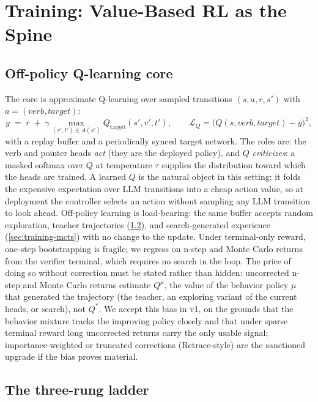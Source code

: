 \section{Training: Value-Based RL as the Spine}
\label{sec:training}

\subsection{Off-policy Q-learning core}
\label{sec:training-core}

The core is approximate Q-learning over sampled transitions
$(s, a, r, s')$ with $a = (\textit{verb}, \textit{target})$:
\[
y \;=\; r \;+\; \gamma \max_{(\textit{v}', \textit{t}') \in A(s')}
Q_{\mathrm{target}}(s', \textit{v}', \textit{t}'),
\qquad
\mathcal{L}_Q = \big(Q(s, \textit{verb}, \textit{target}) - y\big)^2,
\]
with a replay buffer and a periodically synced target network. The roles
are: the verb and pointer heads \emph{act} (they are the deployed policy),
and $Q$ \emph{criticizes}: a masked softmax over $Q$ at temperature $\tau$
supplies the distribution toward which the heads are trained. A learned
$Q$ is the natural object in this setting: it folds the expensive
expectation over LLM transitions into a cheap action value, so at
deployment the controller selects an action without sampling any LLM
transition to look ahead. Off-policy learning is load-bearing: the same
buffer accepts random exploration, teacher trajectories
(\cref{sec:training-ladder}), and search-generated experience
(\cref{sec:training-mcts}) with no change to the update. Under
terminal-only reward, one-step bootstrapping is fragile; we regress on
n-step and Monte Carlo returns from the verifier terminal, which requires
no search in the loop. The price of doing so without correction must be
stated rather than hidden: uncorrected n-step and Monte Carlo returns
estimate $Q^{\mu}$, the value of the behavior policy $\mu$ that generated
the trajectory (the teacher, an exploring variant of the current heads, or
search), not $Q^{*}$. We accept this bias in v1, on the grounds that the
behavior mixture tracks the improving policy closely and that under sparse
terminal reward long uncorrected returns carry the only usable signal;
importance-weighted or truncated corrections (Retrace-style) are the
sanctioned upgrade if the bias proves material.

\subsection{The three-rung ladder}
\label{sec:training-ladder}

